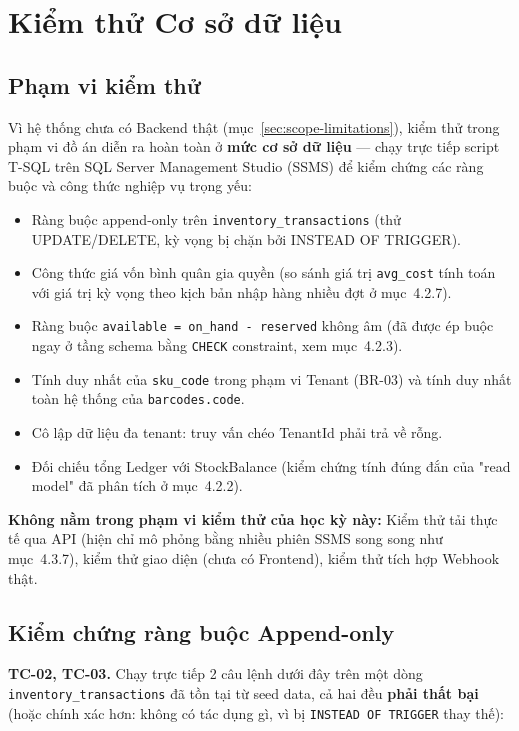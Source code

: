 \section{Kiểm thử Cơ sở dữ liệu}

\subsection{Phạm vi kiểm thử}
Vì hệ thống chưa có Backend thật (mục~\ref{sec:scope-limitations}), kiểm thử trong phạm vi đồ án diễn ra hoàn toàn ở \textbf{mức cơ sở dữ liệu} — chạy trực tiếp script T-SQL trên SQL Server Management Studio (SSMS) để kiểm chứng các ràng buộc và công thức nghiệp vụ trọng yếu:
\begin{itemize}
    \item Ràng buộc append-only trên \texttt{inventory\_transactions} (thử UPDATE/DELETE, kỳ vọng bị chặn bởi INSTEAD OF TRIGGER).
    \item Công thức giá vốn bình quân gia quyền (so sánh giá trị \texttt{avg\_cost} tính toán với giá trị kỳ vọng theo kịch bản nhập hàng nhiều đợt ở mục~4.2.7).
    \item Ràng buộc \texttt{available = on\_hand - reserved} không âm (đã được ép buộc ngay ở tầng schema bằng \texttt{CHECK} constraint, xem mục~4.2.3).
    \item Tính duy nhất của \texttt{sku\_code} trong phạm vi Tenant (BR-03) và tính duy nhất toàn hệ thống của \texttt{barcodes.code}.
    \item Cô lập dữ liệu đa tenant: truy vấn chéo TenantId phải trả về rỗng.
    \item Đối chiếu tổng Ledger với StockBalance (kiểm chứng tính đúng đắn của "read model" đã phân tích ở mục~4.2.2).
\end{itemize}

\textbf{Không nằm trong phạm vi kiểm thử của học kỳ này:} Kiểm thử tải thực tế qua API (hiện chỉ mô phỏng bằng nhiều phiên SSMS song song như mục~4.3.7), kiểm thử giao diện (chưa có Frontend), kiểm thử tích hợp Webhook thật.

\subsection{Kiểm chứng ràng buộc Append-only}
\textbf{TC-02, TC-03.} Chạy trực tiếp 2 câu lệnh dưới đây trên một dòng \texttt{inventory\_transactions} đã tồn tại từ seed data, cả hai đều \textbf{phải thất bại} (hoặc chính xác hơn: không có tác dụng gì, vì bị \texttt{INSTEAD OF TRIGGER} thay thế):


